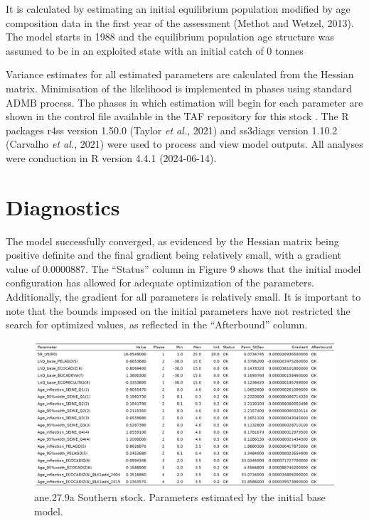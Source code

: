 \documentclass[
]{article}
\begin{document}
It is calculated by estimating an initial equilibrium population
modified by age composition data in the first year of the assessment
(Methot and Wetzel, 2013). The model starts in 1988 and the equilibrium
population age structure was assumed to be in an exploited state with an
initial catch of 0 tonnes

Variance estimates for all estimated parameters are calculated from the
Hessian matrix. Minimisation of the likelihood is implemented in phases
using standard ADMB process. The phases in which estimation will begin
for each parameter are shown in the control file available in the TAF
repository for this stock . The R packages r4ss version 1.50.0 (Taylor
\emph{et al.}, 2021) and ss3diags version 1.10.2 (Carvalho \emph{et
al.}, 2021) were used to process and view model outputs. All analyses
were conduction in R version 4.4.1 (2024-06-14).

\hypertarget{diagnostics}{%
\section{Diagnostics}\label{diagnostics}}

The model successfully converged, as evidenced by the Hessian matrix
being positive definite and the final gradient being relatively small,
with a gradient value of 0.0000887. The ``Status'' column in Figure 9
shows that the initial model configuration has allowed for adequate
optimization of the parameters. Additionally, the gradient for all
parameters is relatively small. It is important to note that the bounds
imposed on the initial parameters have not restricted the search for
optimized values, as reflected in the ``Afterbound'' column.

\begin{figure}[H]

{\centering \includegraphics[width=0.95\linewidth]{report/run/S1.0_4FLEETS_SelECO_RecIndex_Mnewfix/tb_params_est} 

}

\caption{ane.27.9a Southern stock. Parameters estimated by the initial base model.}\label{fig:unnamed-chunk-39}
\end{figure}
\end{document}
